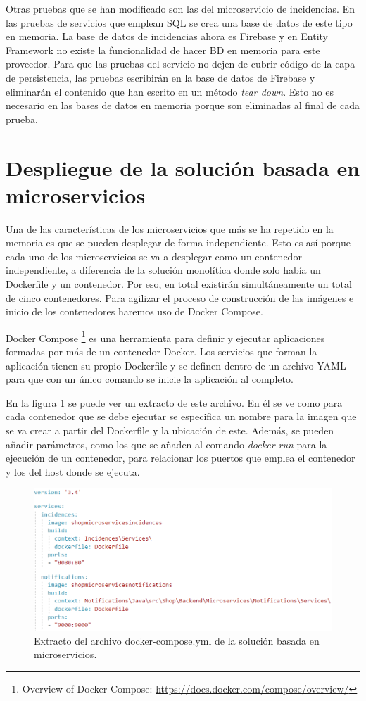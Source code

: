 \documentclass[11pt,spanish,listoffigures]{tfgetsinf}
\begin{document}
Otras pruebas que se han modificado son las del microservicio de incidencias. En las pruebas de servicios que emplean SQL se crea una base de datos de este tipo en memoria. La base de datos de incidencias ahora es Firebase y en Entity Framework no existe la funcionalidad de hacer BD en memoria para este proveedor. Para que las pruebas del servicio no dejen de cubrir código de la capa de persistencia, las pruebas escribirán en la base de datos de Firebase y eliminarán el contenido que han escrito en un método \textit{tear down}. Esto no es necesario en las bases de datos en memoria porque son eliminadas al final de cada prueba.

\section{Despliegue de la solución basada en microservicios} \label{sect:DespliegueMicroservicios}

Una de las características de los microservicios que más se ha repetido en la memoria es que se pueden desplegar de forma independiente. Esto es así porque cada uno de los microservicios se va a desplegar como un contenedor independiente, a diferencia de la solución monolítica donde solo había un Dockerfile y un contenedor. Por eso, en total existirán simultáneamente un total de cinco contenedores. Para agilizar el proceso de construcción de las imágenes e inicio de los contenedores haremos uso de Docker Compose. 

Docker Compose  \footnote{ Overview of Docker Compose: \url{https://docs.docker.com/compose/overview/}}  es una herramienta para definir y ejecutar aplicaciones formadas por más de un contenedor Docker. Los servicios que forman la aplicación tienen su propio Dockerfile y se definen dentro de un archivo YAML para que con un único comando se inicie la aplicación al completo.

En la figura \ref{fig:Compose} se puede ver un extracto de este archivo. En él se ve como para cada contenedor que se debe ejecutar se especifica un nombre para la imagen que se va crear a partir del Dockerfile y la ubicación de este. Además, se pueden añadir parámetros, como los que se añaden al comando \textit{docker run} para la ejecución de un contenedor, para relacionar los puertos que emplea el contenedor y los del host donde se ejecuta.

\begin{figure}[h]
\centering
\includegraphics[scale=0.6]{Compose}
\caption{Extracto del archivo docker-compose.yml de la solución basada en microservicios.}
\label{fig:Compose}
\end{figure}
\end{document}
